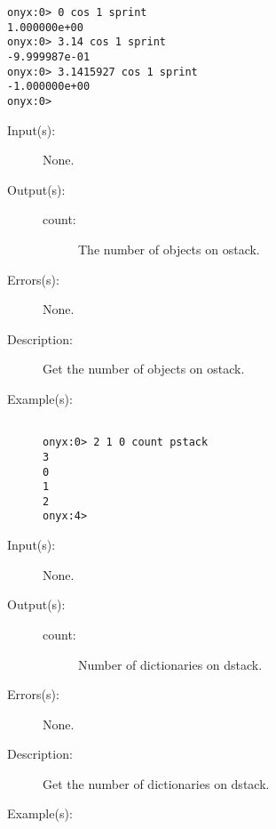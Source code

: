 \begin{description}
\begin{description}
\begin{verbatim}
onyx:0> 0 cos 1 sprint
1.000000e+00
onyx:0> 3.14 cos 1 sprint
-9.999987e-01
onyx:0> 3.1415927 cos 1 sprint
-1.000000e+00
onyx:0>
		\end{verbatim}
	\end{description}
\label{systemdict:count}
\item[{\onyxop{--}{count}{count}}: ]
	\begin{description}\item[]
	\item[Input(s): ] None.
	\item[Output(s): ]
		\begin{description}\item[]
		\item[count: ]
			The number of objects on ostack.
		\end{description}
	\item[Errors(s): ] None.
	\item[Description: ]
		Get the number of objects on ostack.
	\item[Example(s): ]\begin{verbatim}

onyx:0> 2 1 0 count pstack
3
0
1
2
onyx:4>
		\end{verbatim}
	\end{description}
\label{systemdict:countdstack}
\item[{\onyxop{--}{countdstack}{count}}: ]
	\begin{description}\item[]
	\item[Input(s): ] None.
	\item[Output(s): ]
		\begin{description}\item[]
		\item[count: ]
			Number of dictionaries on dstack.
		\end{description}
	\item[Errors(s): ] None.
	\item[Description: ]
		Get the number of dictionaries on dstack.
	\item[Example(s): ]\begin{verbatim}


\end{verbatim}
\end{description}
\end{description}
